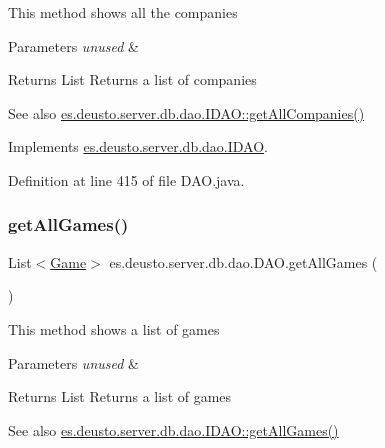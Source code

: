This method shows all the companies 
\begin{DoxyParams}{Parameters}
{\em unused} & \\
\hline
\end{DoxyParams}
\begin{DoxyReturn}{Returns}
List Returns a list of companies 
\end{DoxyReturn}
\begin{DoxySeeAlso}{See also}
\hyperlink{interfacees_1_1deusto_1_1server_1_1db_1_1dao_1_1_i_d_a_o_ad83c37658f356cb69c1fa70f99416579}{es.\+deusto.\+server.\+db.\+dao.\+I\+D\+A\+O\+::get\+All\+Companies()} 
\end{DoxySeeAlso}


Implements \hyperlink{interfacees_1_1deusto_1_1server_1_1db_1_1dao_1_1_i_d_a_o_ad83c37658f356cb69c1fa70f99416579}{es.\+deusto.\+server.\+db.\+dao.\+I\+D\+AO}.



Definition at line 415 of file D\+A\+O.\+java.

\mbox{\label{classes_1_1deusto_1_1server_1_1db_1_1dao_1_1_d_a_o_af49ed57bdac4dec48ab7616602d12df2}} 
\subsubsection{\texorpdfstring{get\+All\+Games()}{getAllGames()}}
{\footnotesize\ttfamily List$<$\hyperlink{classes_1_1deusto_1_1server_1_1db_1_1data_1_1_game}{Game}$>$ es.\+deusto.\+server.\+db.\+dao.\+D\+A\+O.\+get\+All\+Games (\begin{DoxyParamCaption}{ }\end{DoxyParamCaption})}

This method shows a list of games 
\begin{DoxyParams}{Parameters}
{\em unused} & \\
\hline
\end{DoxyParams}
\begin{DoxyReturn}{Returns}
List Returns a list of games 
\end{DoxyReturn}
\begin{DoxySeeAlso}{See also}
\hyperlink{interfacees_1_1deusto_1_1server_1_1db_1_1dao_1_1_i_d_a_o_aebafef372cf3064b12d16fcb651b41ff}{es.\+deusto.\+server.\+db.\+dao.\+I\+D\+A\+O\+::get\+All\+Games()} 
\end{DoxySeeAlso}


